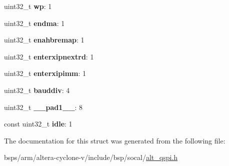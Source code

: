 \begin{DoxyCompactItemize}
uint32\+\_\+t {\bfseries wp}\+: 1
\item 
\mbox{\label{structALT__QSPI__CFG__s_aa598f9da88f5c27b08cb1b1027ce392b}} 
uint32\+\_\+t {\bfseries endma}\+: 1
\item 
\mbox{\label{structALT__QSPI__CFG__s_a33bd194252aa9aaa731bb3fa192b5d5b}} 
uint32\+\_\+t {\bfseries enahbremap}\+: 1
\item 
\mbox{\label{structALT__QSPI__CFG__s_a163cfb0039575b1ae8a2a780f825d7d0}} 
uint32\+\_\+t {\bfseries enterxipnextrd}\+: 1
\item 
\mbox{\label{structALT__QSPI__CFG__s_a87525965862ad7be67c2b0b42a3424cf}} 
uint32\+\_\+t {\bfseries enterxipimm}\+: 1
\item 
\mbox{\label{structALT__QSPI__CFG__s_a9d8751d1660d49e564a8781bfb6755b4}} 
uint32\+\_\+t {\bfseries bauddiv}\+: 4
\item 
\mbox{\label{structALT__QSPI__CFG__s_a5f7b637a0689889bd80b4a11c4508380}} 
uint32\+\_\+t {\bfseries \+\_\+\+\_\+pad1\+\_\+\+\_\+}\+: 8
\item 
\mbox{\label{structALT__QSPI__CFG__s_afa0d9e1b36b4a7292ada4d97b2f52eed}} 
const uint32\+\_\+t {\bfseries idle}\+: 1
\end{DoxyCompactItemize}


The documentation for this struct was generated from the following file\+:\begin{DoxyCompactItemize}
\item 
bsps/arm/altera-\/cyclone-\/v/include/bsp/socal/\mbox{\hyperlink{include_2bsp_2socal_2alt__qspi_8h}{alt\+\_\+qspi.\+h}}\end{DoxyCompactItemize}
